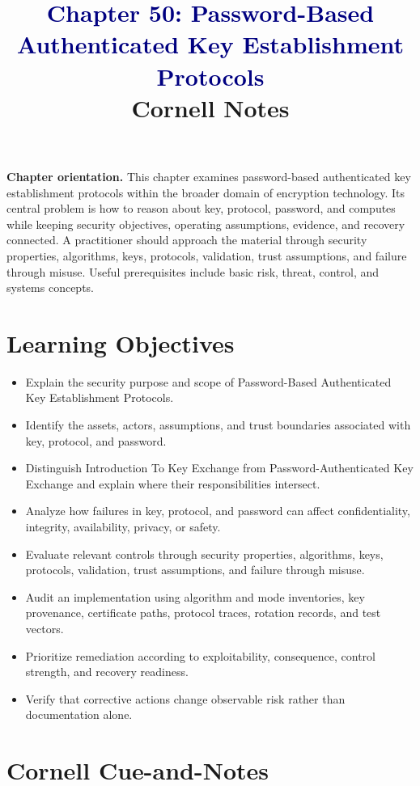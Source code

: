 \documentclass[11pt]{article}
\title{\textcolor{Navy}{Chapter 50: Password-Based Authenticated Key Establishment Protocols}\\[2mm]\large Cornell Notes}
\author{}
\date{}
\begin{document}
\maketitle
\thispagestyle{fancy}
\vspace{-1.5em}
\begin{orientationbox}
\textbf{Chapter orientation.} This chapter examines password-based authenticated key establishment protocols within the broader domain of encryption technology. Its central problem is how to reason about key, protocol, password, and computes while keeping security objectives, operating assumptions, evidence, and recovery connected. A practitioner should approach the material through security properties, algorithms, keys, protocols, validation, trust assumptions, and failure through misuse. Useful prerequisites include basic risk, threat, control, and systems concepts.
\end{orientationbox}
\section*{Learning Objectives}
\begin{itemize}
\item Explain the security purpose and scope of Password-Based Authenticated Key Establishment Protocols.
\item Identify the assets, actors, assumptions, and trust boundaries associated with key, protocol, and password.
\item Distinguish Introduction To Key Exchange from Password-Authenticated Key Exchange and explain where their responsibilities intersect.
\item Analyze how failures in key, protocol, and password can affect confidentiality, integrity, availability, privacy, or safety.
\item Evaluate relevant controls through security properties, algorithms, keys, protocols, validation, trust assumptions, and failure through misuse.
\item Audit an implementation using algorithm and mode inventories, key provenance, certificate paths, protocol traces, rotation records, and test vectors.
\item Prioritize remediation according to exploitability, consequence, control strength, and recovery readiness.
\item Verify that corrective actions change observable risk rather than documentation alone.
\end{itemize}
\section*{Cornell Cue-and-Notes}
\end{document}
